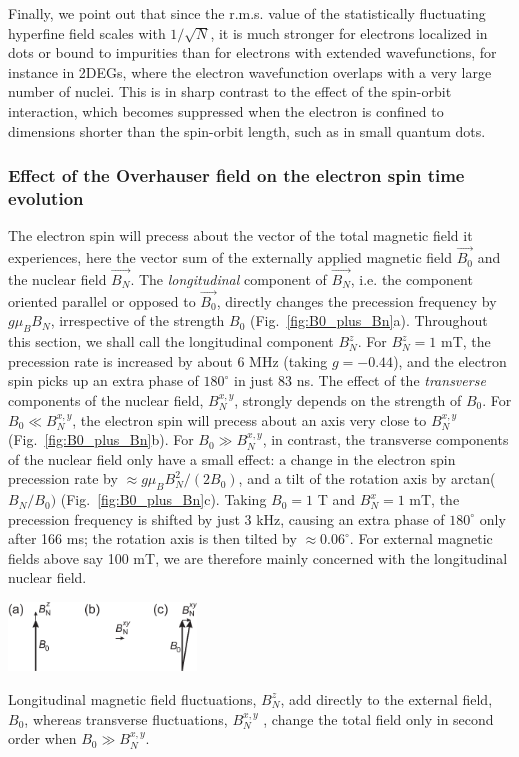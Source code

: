 \documentclass[12pt,aps,nofootinbib]{revtex4-1}
\begin{document}
Finally, we point out that since the r.m.s. value of the statistically fluctuating hyperfine field scales with $1/\sqrt{N}$, it is much stronger for electrons localized in dots or bound to impurities than for electrons with extended wavefunctions, for instance in 2DEGs, where the electron wavefunction overlaps with a very large number of nuclei. This is in sharp contrast to the effect of the spin-orbit interaction, which becomes suppressed when the electron is confined to dimensions shorter than the spin-orbit length, such as in small quantum dots.


\subsubsection{Effect of the Overhauser field on the electron spin time evolution}
\label{sec:effect_BN}

The electron spin will precess about the vector of the total
magnetic field it experiences, here the vector sum of the
externally applied magnetic field $\vec{B_0}$ and the nuclear
field $\vec{B_N}$. The \emph{longitudinal} component of
$\vec{B_N}$, i.e. the component oriented parallel or opposed to
$\vec{B_0}$, directly changes the precession frequency by $g \mu_B
B_N$, irrespective of the strength $B_0$
(Fig.~\ref{fig:B0_plus_Bn}a). Throughout this section, we shall
call the longitudinal component $B_N^z$. For $B_N^z = 1$ mT, the
precession rate is increased by about 6 MHz (taking $g=-0.44$), and the electron spin picks up an extra phase of $180^\circ$ in just 83 ns. The effect of the \emph{transverse} components of the nuclear field,
$B_N^{x,y}$, strongly depends on the strength of $B_0$. For $B_0
\ll B_N^{x,y}$, the electron spin will precess about an axis
very close to $B_N^{x,y}$ (Fig.~\ref{fig:B0_plus_Bn}b). For $B_0
\gg B_N^{x,y}$, in contrast, the transverse components of the
nuclear field only have a small effect: a change in the electron
spin precession rate by $\approx g \mu_B B_N^2/(2 B_0)$, and a
tilt of the rotation axis by arctan($B_N/B_0)$
(Fig.~\ref{fig:B0_plus_Bn}c). Taking $B_0 = 1$ T and $B_N^x = 1$
mT, the precession frequency is shifted by just 3 kHz, causing an
extra phase of $180^\circ$ only after 166 ms; the rotation axis is
then tilted by $\approx 0.06^\circ$. For external magnetic fields
above say 100 mT, we are therefore mainly concerned with the
longitudinal nuclear field.

\bfig
\begin{center}
\includegraphics[width=5cm]{hanson_fig25.eps}
\end{center}
\caption{Longitudinal magnetic field fluctuations, $B_N^z$, add
directly to the external field, $B_0$, whereas transverse
fluctuations, $B_N^{x,y}$ , change the total field only in second
order when $B_0 \gg B_N^{x,y}$.} 
\label{fig:B0_plus_Bn} 
\efig
\end{document}
